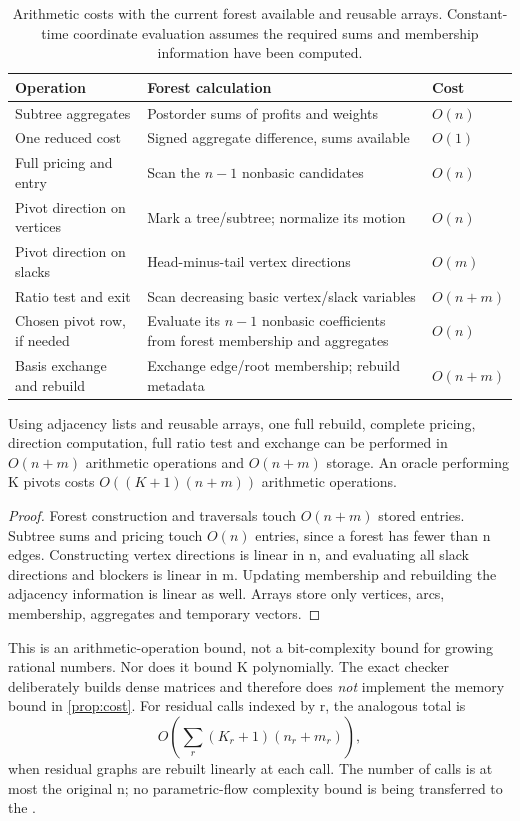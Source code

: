\begin{table}[htbp]
\centering\small
\renewcommand{\arraystretch}{1.15}
\begin{tabular}{p{.29\linewidth}p{.49\linewidth}l}
\toprule
Operation & Forest calculation & Cost\\
\midrule
Subtree aggregates & Postorder sums of profits and weights & $O(n)$\\
One reduced cost & Signed aggregate difference, sums available & $O(1)$\\
Full pricing and entry & Scan the $n-1$ nonbasic candidates & $O(n)$\\
Pivot direction on vertices & Mark a tree/subtree; normalize its motion & $O(n)$\\
Pivot direction on slacks & Head-minus-tail vertex directions & $O(m)$\\
Ratio test and exit & Scan decreasing basic vertex/slack variables & $O(n+m)$\\
Chosen pivot row, if needed & Evaluate its $n-1$ nonbasic coefficients from forest membership and aggregates & $O(n)$\\
Basis exchange and rebuild & Exchange edge/root membership; rebuild metadata & $O(n+m)$\\
\bottomrule
\end{tabular}
\caption{Arithmetic costs with the current forest available and reusable
arrays. Constant-time coordinate evaluation assumes the required sums and
membership information have been computed.}\label{tab:operation-costs}
\end{table}

\begin{proposition}
\label{prop:cost}
Using adjacency lists and reusable arrays, one full rebuild, complete pricing,
direction computation, full ratio test and exchange can be performed in
$O(n+m)$ arithmetic operations and $O(n+m)$ storage. An oracle performing
K pivots costs $O((K+1)(n+m))$ arithmetic operations.
\end{proposition}
\begin{proof}
Forest construction and traversals touch $O(n+m)$ stored entries. Subtree
sums and pricing touch $O(n)$ entries, since a forest has fewer than n edges.
Constructing vertex directions is linear in n, and evaluating all slack
directions and blockers is linear in m. Updating membership and rebuilding
the adjacency information is linear as well. Arrays store only vertices, arcs,
membership, aggregates and temporary vectors.
\end{proof}
This is an arithmetic-operation bound, not a bit-complexity bound for growing
rational numbers. Nor does it bound K polynomially. The exact checker
deliberately builds dense matrices and therefore does \emph{not} implement
the memory bound in \cref{prop:cost}.
For residual calls indexed by r, the analogous total is
\[
 O\!\left(\sum_r(K_r+1)(n_r+m_r)\right),
\]
when residual graphs are rebuilt linearly at each call. The number of calls
is at most the original n; no parametric-flow complexity bound is being
transferred to the \FS{}.

